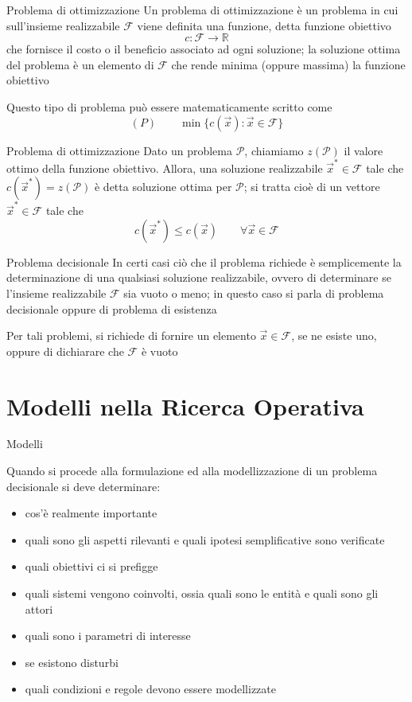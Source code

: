 \documentclass{beamer}
\begin{document}
\begin{frame}{Problema di ottimizzazione}
Un \alert{problema di ottimizzazione} \`e un problema in cui sull'insieme
realizzabile $\mathcal{F}$ viene definita una funzione, detta \alert{funzione
obiettivo}
\[
c:\mathcal{F}\rightarrow\mathbb{R}
\]
che fornisce il costo o il beneficio associato ad ogni soluzione;
la \alert{soluzione ottima} del problema \`e un elemento di $\mathcal{F}$
che rende minima (oppure massima) la funzione obiettivo

Questo tipo di problema pu\`o essere matematicamente scritto come
\[
(P)\qquad\min\{c(\vec{x}):\vec{x}\in \mathcal{F}\}
\]
\end{frame}

\begin{frame}{Problema di ottimizzazione}
 Dato un problema $\mathcal{P}$, chiamiamo $z(\mathcal{P})$ il valore
ottimo della funzione obiettivo. Allora, una soluzione realizzabile
$\vec{x}^{*}\in\mathcal{F}$ tale che $c(\vec{x}^{*})=z(\mathcal{P})$ \`e detta soluzione ottima per
$\mathcal{P}$; si tratta cio\`e di un vettore $\vec{x}^{*}\in \mathcal{F}$ tale che
\[
c(\vec{x}^{*})\leq c(\vec{x})\qquad\forall \vec{x}\in \mathcal{F}
\]
\end{frame}

\begin{frame}{Problema decisionale}
In certi casi ci\`o che il problema richiede \`e semplicemente la determinazione
di una qualsiasi soluzione realizzabile, ovvero di determinare se
l'insieme realizzabile $\mathcal{F}$ sia vuoto o meno; in questo caso si
parla di \alert{problema decisionale} oppure di \alert{problema di esistenza}


Per tali problemi, si richiede di fornire un elemento $\vec{x}\in\mathcal{F}$, se
ne esiste uno, oppure di dichiarare che $\mathcal{F}$ \`e vuoto
\end{frame}


\section{Modelli nella Ricerca Operativa}

\begin{frame}{Modelli}

 Quando si procede alla \alert{formulazione} ed alla \alert{modellizzazione}
 di un problema decisionale si deve determinare:
  \begin{itemize}
    \item 
 cos'\`e realmente importante
    \item 
 quali sono gli aspetti rilevanti e quali ipotesi semplificative sono verificate
    \item 
 quali obiettivi ci si prefigge
    \item 
 quali sistemi vengono coinvolti, ossia quali sono le entit\`a e quali sono gli attori
    \item 
 quali sono i parametri di interesse
    \item 
 se esistono disturbi
    \item 
 quali condizioni e regole devono essere modellizzate
  \end{itemize} 
\end{frame}
\end{document}
